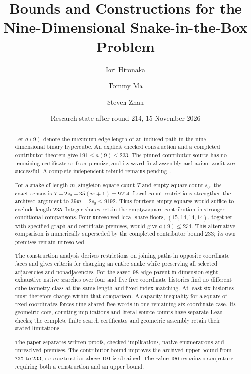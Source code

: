\documentclass[11pt,a4paper]{article}
\title{Bounds and Constructions for the\\
Nine-Dimensional Snake-in-the-Box Problem}
\author{Iori Hironaka \and Tommy Ma \and Steven Zhan}
\date{Research state after round 214, 15 November 2026}
\theoremstyle{definition}
\theoremstyle{remark}
\begin{document}
\maketitle
\begin{abstract}
Let $a(9)$ denote the maximum edge length of an induced path in the
nine-dimensional binary hypercube. An explicit checked construction and
a completed contributor theorem give $191\le a(9)\le233$.
The pinned contributor source has no remaining certificate or floor
premise, and its saved final assembly and axiom audit are successful.
A complete independent rebuild remains pending~\cite{bound233archive}.

For a snake of length $m$, singleton-square count $T$ and empty-square
count $s_0$, the exact census is $T+2s_0+35(m+1)=9214$.
Local count restrictions strengthen the archived argument to
$39m+2s_0\le9192$. Thus fourteen empty squares would suffice to exclude
length 235. Integer shares retain the empty-square contribution in
stronger conditional comparisons. Four unresolved local share floors,
$(15,14,14,14)$, together with specified graph and certificate premises,
would give $a(9)\le234$. This alternative comparison is numerically
superseded by the completed contributor bound 233; its own premises
remain unresolved.

The construction analysis derives restrictions on joining paths in
opposite coordinate faces and gives criteria for changing an entire
snake while preserving all selected adjacencies and nonadjacencies.
For the saved 98-edge parent in dimension eight, exhaustive native
searches over four and five free coordinate histories find no different
cube-isometry class at the same length and fixed index matching.
At least six histories must therefore change within that comparison.
A capacity inequality for a square of fixed coordinates forces nine
shared free words in one remaining six-coordinate case. Its geometric
core, counting implications and literal source counts have separate
Lean checks; the complete finite search certificates and geometric
assembly retain their stated limitations.

The paper separates written proofs, checked implications, native
enumerations and unresolved premises. The contributor bound improves
the archived upper bound from 235 to 233; no construction above 191
is obtained. The value 196
remains a conjecture requiring both a construction and an upper bound.
\end{abstract}

\clearpage
\setcounter{tocdepth}{1}
\tableofcontents
\clearpage
\end{document}

